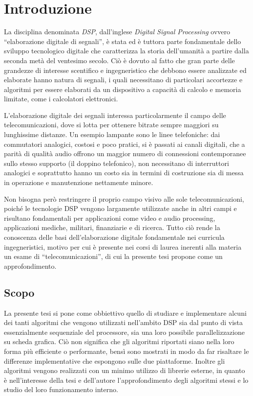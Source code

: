 \chapter{Introduzione}
La disciplina denominata \textit{DSP}, dall'inglese \textit{Digital Signal Processing} ovvero ``elaborazione digitale di segnali'', è stata ed è tuttora parte fondamentale dello sviluppo tecnologico digitale che caratterizza la storia dell'umanità a partire dalla seconda metà del ventesimo secolo. Ciò è dovuto al fatto che gran parte delle grandezze di interesse scentifico e ingegneristico che debbono essere analizzate ed elaborate hanno natura di segnali, i quali necessitano di particolari accortezze e algoritmi per essere elaborati da un dispositivo a capacità di calcolo e memoria limitate, come i calcolatori elettronici.

L'elaborazione digitale dei segnali interessa particolarmente il campo delle telecomunicazioni, dove si lotta per ottenere bitrate sempre maggiori su lunghissime distanze. Un esempio lampante sono le linee telefoniche: dai commutatori analogici, costosi e poco pratici, si è passati ai canali digitali, che a parità di qualità audio offrono un maggior numero di connessioni contemporanee sullo stesso supporto (il doppino telefonico), non necessitano di interruttori analogici e soprattutto hanno un costo sia in termini di costruzione sia di messa in operazione e manutenzione nettamente minore.

Non bisogna però restringere il proprio campo visivo alle sole telecomunicazioni, poiché le tecnologie DSP vengono largamente utilizzate anche in altri campi e risultano fondamentali per applicazioni come video e audio processing, applicazioni mediche, militari, finanziarie e di ricerca. Tutto ciò rende la conoscenza delle basi dell'elaborazione digitale fondamentale nei curricula ingegneristici, motivo per cui è presente nei corsi di laurea inerenti alla materia un esame di ``telecomunicazioni'', di cui la presente tesi propone come un approfondimento.

\section{Scopo}
La presente tesi si pone come obbiettivo quello di studiare e implementare alcuni dei tanti algoritmi che vengono utilizzati nell'ambito DSP sia dal punto di vista essenzialmente sequenziale del processore, sia una loro possibile parallelizzazione su scheda grafica. Ciò non significa che gli algoritmi riportati siano nella loro forma più efficiente o performante, bensì sono mostrati in modo da far risaltare le differenze implementative che espongono sulle due piattaforme. Inoltre gli algoritmi vengono realizzati con un minimo utilizzo di librerie esterne, in quanto è nell'interesse della tesi e dell'autore l'approfondimento degli algoritmi stessi e lo studio del loro funzionamento interno.

